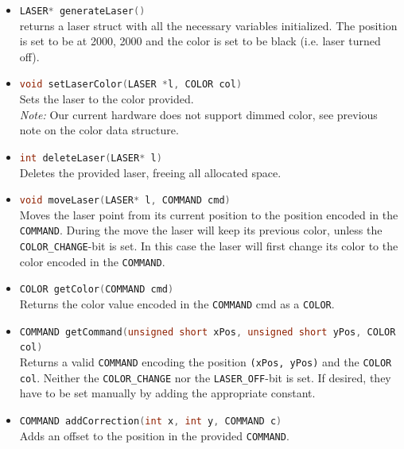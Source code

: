 \documentclass{report}
\begin{document}
\begin{itemize}
	\item \lstinline[language=c++]{LASER* generateLaser()} \\
		returns a laser struct with all the necessary variables initialized. The position is set to be at 2000, 2000 and the color is set to be black (i.e. laser turned off).
	\item \lstinline[language=c++]{void setLaserColor(LASER *l, COLOR col)} \\
		Sets the laser to the color provided.\\
		\emph{Note:} Our current hardware does not support dimmed color, see previous note on the color data structure.
	\item \lstinline[language=c++]{int deleteLaser(LASER* l)} \\
		Deletes the provided laser, freeing all allocated space.
	\item \lstinline[language=c++]{void moveLaser(LASER* l, COMMAND cmd)} \\
		Moves the laser point from its current position to the position encoded in the \lstinline{COMMAND}. During the move the laser will keep its previous color, unless the \lstinline{COLOR_CHANGE}-bit is set. In this case the laser will first change its color to the color encoded in the \lstinline{COMMAND}.
	\item \lstinline[language=c++]{COLOR getColor(COMMAND cmd)} \\
		Returns the color value encoded in the  \lstinline{COMMAND} cmd as a \lstinline{COLOR}.
	\item \lstinline[language=c++]{COMMAND getCommand(unsigned short xPos, unsigned short yPos, COLOR col)} \\
		Returns a valid \lstinline{COMMAND} encoding the position \lstinline{(xPos, yPos)} and the \lstinline{COLOR col}. Neither the \lstinline{COLOR_CHANGE} nor the \lstinline{LASER_OFF}-bit is set. If desired, they have to be set manually by adding the appropriate constant.
	\item \lstinline[language=c++]{COMMAND addCorrection(int x, int y, COMMAND c)} \\
		Adds an offset to the position in the provided \lstinline{COMMAND}.
\end{itemize}
\end{document}
